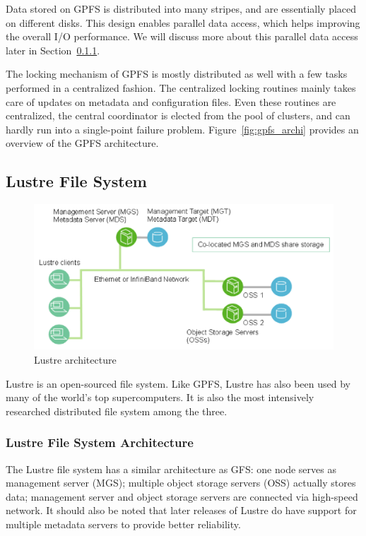 Data stored on GPFS is distributed into many stripes, and are essentially
placed on different disks.
%
This design enables parallel data access, which helps improving the overall
I/O performance.
%
We will discuss more about this parallel data access later in Section~\ref{}.

The locking mechanism of GPFS is mostly distributed as well with a few tasks
performed in a centralized fashion.
%
The centralized locking routines mainly takes care of updates on metadata
and configuration files.
%
Even these routines are centralized, the central coordinator is elected from
the pool of clusters, and can hardly run into a single-point failure problem.
%
Figure~\ref{fig:gpfs_archi} provides an overview of the GPFS architecture.



\subsection{Lustre File System}
\label{sec:archi_lustre}
%
\begin{figure}
\centering
\includegraphics[width=0.99\columnwidth]{image/lustre_architecture.png}
\caption{Lustre architecture}
\label{fig:lustre_archi}
\end{figure}
%
Lustre is an open-sourced file system. 
%
Like GPFS, Lustre has also been used by many of the world's top supercomputers.
%
It is also the most intensively researched distributed file system among 
the three. 

\subsubsection{Lustre File System Architecture}
The Lustre file system has a similar architecture as GFS:
one node serves as management server (MGS); 
multiple object storage servers (OSS) actually stores data;
management server and object storage servers are connected via
high-speed network.
%
It should also be noted that later releases of Lustre do have support
for multiple metadata servers to provide better reliability.

